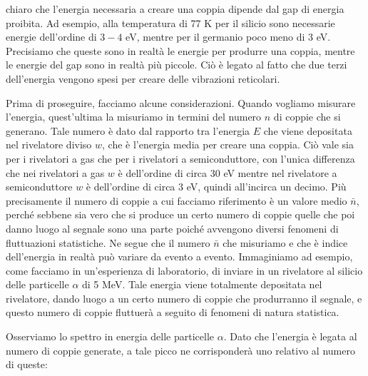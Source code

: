 \E chiaro che l'energia necessaria a creare una coppia dipende dal gap di energia proibita. Ad esempio, alla temperatura di 77 K per il silicio sono necessarie energie dell'ordine di $3-4$ eV, mentre per il germanio poco meno di 3 eV. Precisiamo che queste sono in realtà le energie per produrre una coppia, mentre le energie del gap sono in realtà più piccole. Ciò è legato al fatto che due terzi dell'energia vengono spesi per creare delle vibrazioni reticolari.

Prima di proseguire, facciamo alcune considerazioni. Quando vogliamo misurare l'energia, quest'ultima la misuriamo in termini del numero $n$ di coppie che si generano. Tale numero è dato dal rapporto tra l'energia $E$ che viene depositata nel rivelatore diviso $w$, che è l'energia media per creare una coppia. Ciò vale sia per i rivelatori a gas che per i rivelatori a semiconduttore, con l'unica differenza che nei rivelatori a gas $w$ è dell'ordine di circa 30 eV mentre nel rivelatore a semiconduttore $w$ è dell'ordine di circa 3 eV, quindi all'incirca un decimo. Più precisamente il numero di coppie a cui facciamo riferimento è un valore medio $\bar{n}$, perché sebbene sia vero che si produce un certo numero di coppie quelle che poi danno luogo al segnale sono una parte poiché avvengono diversi fenomeni di fluttuazioni statistiche. Ne segue che il numero $\bar{n}$ che misuriamo e che è indice dell'energia in realtà può variare da evento a evento. Immaginiamo ad esempio, come facciamo in un'esperienza di laboratorio, di inviare in un rivelatore al silicio delle particelle $\alpha$ di 5 MeV. Tale energia viene totalmente depositata nel rivelatore, dando luogo a un certo numero di coppie che produrranno il segnale, e questo numero di coppie fluttuerà a seguito di fenomeni di natura statistica.

Osserviamo lo spettro in energia delle particelle $\alpha$. Dato che l'energia è legata al numero di coppie generate, a tale picco ne corrisponderà uno relativo al numero di queste:

\vspace{-0.2cm}

\begin{figure}[H]
   \centering
\end{figure}

